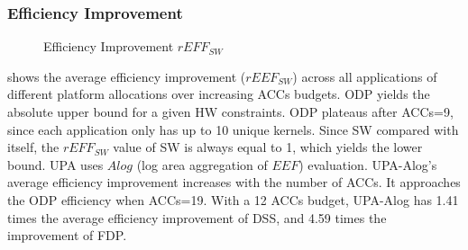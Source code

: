 \subsubsection{Efficiency Improvement}
\label{subsubsec:overall-sw}

\begin{figure}[h]
\vspace{-8pt}
	\centering
		\hfill
	\vspace{-8pt}
	\caption{Efficiency Improvement $rEFF_{SW}$}
	\label{fig:overallsw}
\end{figure}


 shows the average efficiency improvement ($rEEF_{SW}$) across all applications of different platform allocations over increasing ACCs budgets. ODP yields the absolute upper bound for a given HW constraints. ODP plateaus after ACCs=9, since each application only has up to 10 unique kernels. Since SW compared with itself, the $rEFF_{SW}$ value of SW is always equal to 1, which yields the lower bound. UPA uses $Alog$ (log area aggregation of $EEF$) evaluation. UPA-Alog's average efficiency improvement increases with the number of ACCs. It approaches the ODP efficiency when ACCs=19. With a 12 ACCs budget, UPA-Alog has 1.41 times the average efficiency improvement of DSS, and 4.59 times the improvement of FDP.


